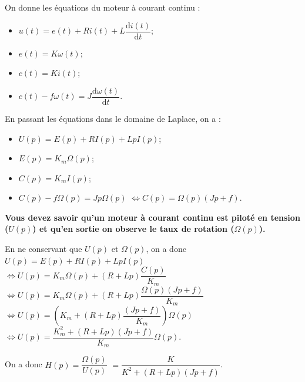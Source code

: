 \normaltrue \difficilefalse \tdifficilefalse
\correctiontrue


\setcounter{question}{0}%
\ifcorrection
\else
{}
\fi


\ifprof 
\else
On donne les équations du moteur à courant continu :
\begin{itemize}
\item $u(t) = e(t)+ Ri(t) +L \dfrac{\text{d}i(t)}{\text{d} t}$;
\item $e(t)=K\omega(t)$;
\item $c(t)=Ki(t)$;
\item $c(t)- f\omega(t)=J\dfrac{\text{d}\omega(t)}{\text{d} t}$.
\end{itemize}
\fi

\ifprof
En passant les équations dans le domaine de Laplace, on a : 
\begin{itemize}
\item $U(p) = E(p)+ RI(p) +LpI(p)$;
\item $E(p)=K_m\Omega(p)$;
\item $C(p)=K_mI(p)$;
\item $C(p)- f\Omega(p)=Jp\Omega(p)$ $\Leftrightarrow C(p)=\Omega(p)\left( Jp +f \right)$.
\end{itemize}

\textbf{Vous devez savoir qu'un moteur à courant continu est piloté en tension ($U(p)$) et qu'en sortie on observe le taux de rotation ($\Omega(p)$). }

En ne conservant que $U(p)$ et $\Omega(p)$, on a donc
$U(p) = E(p)+ RI(p) +LpI(p)$
$ \Leftrightarrow U(p) = K_m\Omega(p)+ \left(R +Lp\right)\dfrac{C(p)}{K_m}$
$ \Leftrightarrow U(p) = K_m\Omega(p)+ \left(R +Lp\right)\dfrac{\Omega(p)\left( Jp +f \right)}{K_m}$
$ \Leftrightarrow U(p) = \left(K_m+ \left(R +Lp\right)\dfrac{\left( Jp +f \right)}{K_m}\right)\Omega(p)$
$ \Leftrightarrow U(p) =  \dfrac{K_m^2 + \left(R +Lp\right)\left( Jp +f \right)}{K_m}\Omega(p)$.

On a donc $H(p)=\dfrac{\Omega(p)}{U(p)}$ $=\dfrac{K}{K^2 +\left(R +Lp\right) \left( Jp +f \right)} $.

